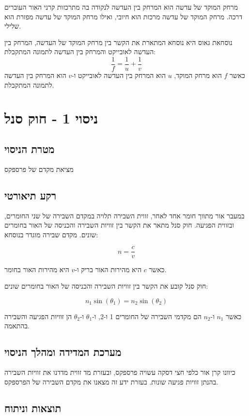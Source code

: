 \documentclass[12pt]{article}
\begin{document}
מרחק המוקד של עדשה הוא המרחק בין העדשה לנקודה בה מתרכזות קרני האור העוברים דרכה.
מרחק המוקד של עדשה מרכזת הוא חיובי, ואילו מרחק המוקד של עדשה מפזרת הוא שלילי.

נוסחאת גאוס היא נוסחא המתארת את הקשר בין מרחק המוקד של העדשה, המרחק בין העדשה לאובייקט והמרחק בין העדשה לתמונה המתקבלת:
\begin{equation}
\frac{1}{f} = \frac{1}{u} + \frac{1}{v}
\end{equation}
כאשר $f$ הוא מרחק המוקד, $u$ הוא המרחק בין העדשה לאובייקט ו-$v$ הוא המרחק בין העדשה לתמונה המתקבלת.

\section*{ניסוי 1 - חוק סנל}
\subsection*{מטרת הניסוי}
מציאת מקדם של פרספקס

\subsection*{רקע תיאורטי}
במעבר אור מתווך חומר אחד לאחר, זווית השבירה תלויה במקדם השבירה של שני החומרים, ובזווית הפגיעה.
חוק סנל מתאר את הקשר בין זוויות השבירה והכניסה של האור בחומרים שונים.
מקדם שבירה מוגדר בנוסחא:

\begin{equation}
    n = \frac{c}{v}
\end{equation}

כאשר $c$ היא מהירות האור בריק ו-$v$ היא מהירות האור בחומר.


חוק סנל קובע את הקשר בין זוויות השבירה והכניסה של האור בחומרים שונים:

\begin{equation}
n_1 \sin(\theta_1) = n_2 \sin(\theta_2)
\end{equation}

כאשר $n_1$ ו-$n_2$ הם מקדמי השבירה של החומרים 1 ו-2, ו-$\theta_1$ ו-$\theta_2$ הן זוויות הפגיעה והשבירה בהתאמה.

\subsection*{מערכת המדידה ומהלך הניסוי}

כיוונו קרן אור כלפי חצי דסקה עשויה פרספקס, ובעזרת מד זווית מדדנו את זוויות השבירה בהנתן זוויות פגיעה שונות. בעזרת ידע זה מצאנו את מקדם השבירה של הפרספקס.

\subsection*{תוצאות וניתוח}
\end{document}
